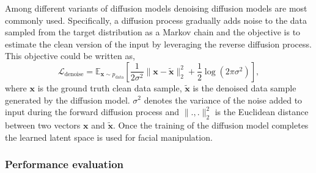 Among different variants of diffusion models denoising diffusion models are most commonly used. Specifically, a diffusion process gradually adds noise to the data sampled from the target distribution as a Markov chain and the objective is to estimate the clean version of the input by leveraging the reverse diffusion process. This objective could be written as,
\begin{equation}
 \mathcal{L}_{\text{denoise}} = \mathbb{E}_{\mathbf{x} \sim p_{\text{data}}} \left[ \frac{1}{2\sigma^2} \| \mathbf{x} - \tilde{\mathbf{x}} \|_2^2 + \frac{1}{2} \log(2\pi\sigma^2) \right],   
\end{equation}
where $\mathbf{x}$ is the ground truth clean data sample, $\tilde{\mathbf{x}}$ is the denoised data sample generated by the diffusion model. $\sigma^2$ denotes the variance of the noise added to input during the forward diffusion process and $\|.,.\|_2^2$ is the Euclidean distance between two vectors $\mathbf{x}$ and $\tilde{\mathbf{x}}$. Once the training of the diffusion model completes the learned latent space is used for facial manipulation.


\subsubsection{Performance evaluation} 

